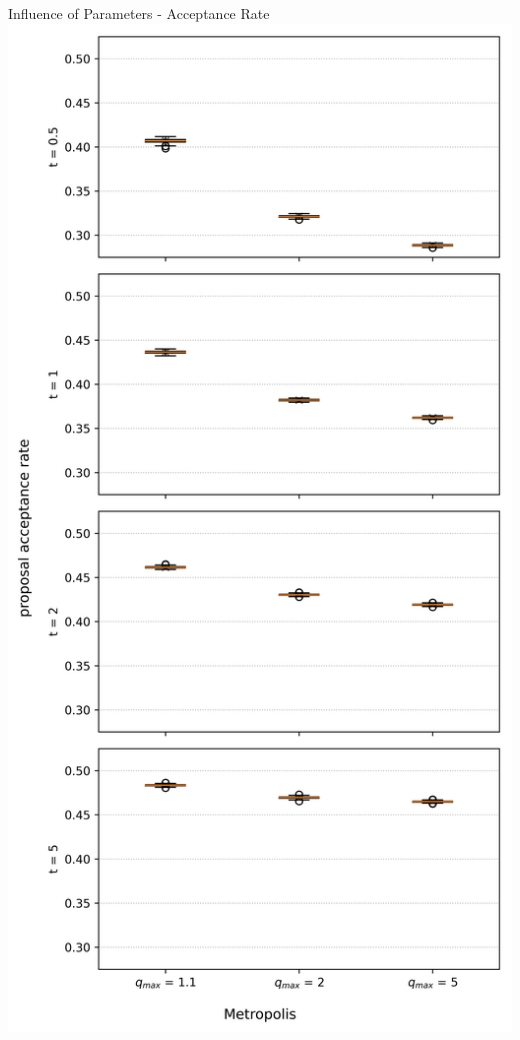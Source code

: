 \documentclass[]{beamer}
\begin{document}
  \begin{frame}{Influence of Parameters - Acceptance Rate}
    \centering
    \includegraphics[scale=0.25]{figs/results/params/acceptance_rates_metropolis.png}

\end{frame}
\end{document}
